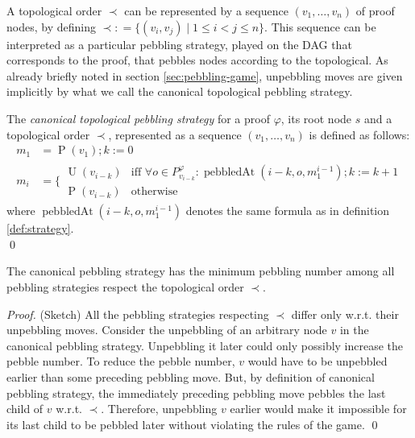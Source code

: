 \documentclass{llncs}
\DeclareMathOperator{\pebble}{P}
\DeclareMathOperator{\unpebble}{U}
\DeclareMathOperator{\pebbledAt}{pebbledAt}
\newcommand{\defeq}{\mathrel{\mathop:}=}
\newcommand{\Premises}[2]{P_{#1}^{#2}}
\begin{document}
\noindent
A topological order $\prec$ can be represented by a sequence $(v_1,\dots,v_n)$ of proof nodes, by defining $\prec \defeq \{(v_i,v_j) \mid 1 \leq i < j \leq n\}$. This sequence can be interpreted as a particular pebbling strategy, played on the DAG that corresponds to the proof, that pebbles nodes according to the topological. As already briefly noted in section \ref{sec:pebbling-game}, unpebbling moves are given implicitly by what we call the canonical topological pebbling strategy.

\begin{definition}
The \emph{canonical topological pebbling strategy} for a proof $\varphi$, its root node $s$ and a topological order $\prec$, represented as a sequence $(v_1,\dots,v_n)$ is defined as follows:
\begin{align*}
m_1 &= \pebble(v_1); k := 0 \\
m_i &= \Bigg\{
\begin{array}{ll}
	\unpebble(v_{i-k}) & \text{iff }\forall o \in \Premises{v_{i-k}}{\varphi}: \pebbledAt(i-k,o,m^{i-1}_1); k := k + 1\\
	\pebble(v_{i-k}) & \text{otherwise}
\end{array}
\end{align*}
where $\pebbledAt(i-k,o,m^{i-1}_1)$ denotes the same formula as in definition \ref{def:strategy}.\\
\qed
\end{definition}

\begin{theorem}
\label{theorem:canonical}
The canonical pebbling strategy has the minimum pebbling number among all pebbling strategies respect the topological order $\prec$.
\end{theorem}
\begin{proof} (Sketch)
All the pebbling strategies respecting $\prec$ differ only w.r.t. their unpebbling moves.
Consider the unpebbling of an arbitrary node $v$ in the canonical pebbling strategy. Unpebbling it later could only possibly increase the pebble number. To reduce the pebble number, $v$ would have to be unpebbled earlier than some preceding pebbling move. But, by definition of canonical pebbling strategy, the immediately preceding pebbling move pebbles the last child of $v$ w.r.t. $\prec$. Therefore, unpebbling $v$ earlier would make it impossible for its last child to be pebbled later without violating the rules of the game.
\qed
\end{proof}
\end{document}

